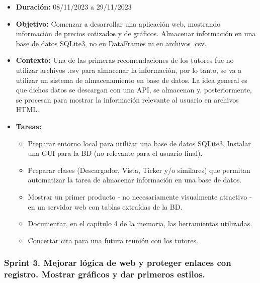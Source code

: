 \begin{itemize}
\item  
\textbf{Duración:} 08/11/2023 a 29/11/2023

\item
\textbf{Objetivo:} Comenzar a desarrollar una aplicación web, mostrando información de precios cotizados y de gráficos. Almacenar información en una base de datos SQLite3, no en DataFrames ni en archivos .csv. 

\item
\textbf{Contexto:} Una de las primeras recomendaciones de los tutores fue no utilizar archivos .csv para almacenar la información, por lo tanto, se va a utilizar un sistema de almacenamiento en base de datos. La idea general es que dichos datos se descargan con una API, se almacenan y, posteriormente, se procesan para mostrar la información relevante al usuario en archivos HTML. 

\item
\textbf{Tareas:}
	\begin{itemize}
	\tightlist
	\item 
	Preparar entorno local para utilizar una base de datos SQLite3. Instalar una GUI para la BD (no relevante para el usuario final). 
	\item 	
	Preparar clases (Descargador, Vista, Ticker y/o similares) que permitan automatizar la tarea de almacenar información en una base de datos. 
	\item 
	Mostrar un primer producto - no necesariamente visualmente atractivo - en un servidor web con tablas extraídas de la BD. 
  	\item 
  	Documentar, en el capítulo 4 de la memoria, las herramientas utilizadas. 
  	\item 
  	Concertar cita para una futura reunión con los tutores. 
  	\end{itemize}
\end{itemize}


\subsubsection{Sprint 3. Mejorar lógica de web y proteger enlaces con registro. Mostrar gráficos y dar primeros estilos.}

